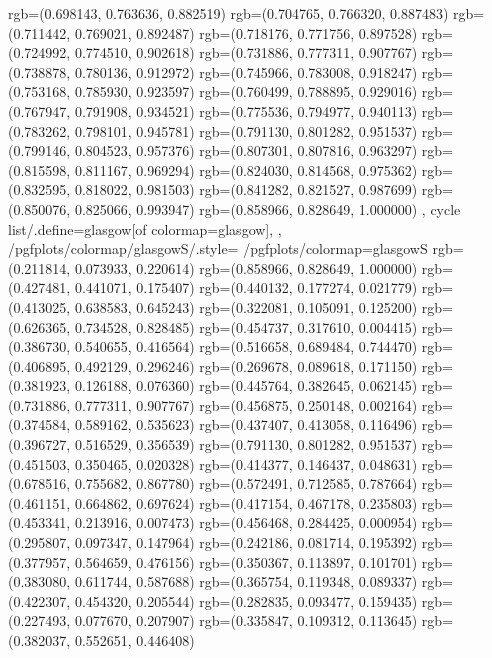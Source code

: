 {{{					rgb=(0.698143, 0.763636, 0.882519)
					rgb=(0.704765, 0.766320, 0.887483)
					rgb=(0.711442, 0.769021, 0.892487)
					rgb=(0.718176, 0.771756, 0.897528)
					rgb=(0.724992, 0.774510, 0.902618)
					rgb=(0.731886, 0.777311, 0.907767)
					rgb=(0.738878, 0.780136, 0.912972)
					rgb=(0.745966, 0.783008, 0.918247)
					rgb=(0.753168, 0.785930, 0.923597)
					rgb=(0.760499, 0.788895, 0.929016)
					rgb=(0.767947, 0.791908, 0.934521)
					rgb=(0.775536, 0.794977, 0.940113)
					rgb=(0.783262, 0.798101, 0.945781)
					rgb=(0.791130, 0.801282, 0.951537)
					rgb=(0.799146, 0.804523, 0.957376)
					rgb=(0.807301, 0.807816, 0.963297)
					rgb=(0.815598, 0.811167, 0.969294)
					rgb=(0.824030, 0.814568, 0.975362)
					rgb=(0.832595, 0.818022, 0.981503)
					rgb=(0.841282, 0.821527, 0.987699)
					rgb=(0.850076, 0.825066, 0.993947)
					rgb=(0.858966, 0.828649, 1.000000)
			},
		cycle list/.define={glasgow}{[of colormap=glasgow]},
		},
		/pgfplots/colormap/glasgowS/.style={
			/pgfplots/colormap={glasgowS}{%
					rgb=(0.211814, 0.073933, 0.220614)
					rgb=(0.858966, 0.828649, 1.000000)
					rgb=(0.427481, 0.441071, 0.175407)
					rgb=(0.440132, 0.177274, 0.021779)
					rgb=(0.413025, 0.638583, 0.645243)
					rgb=(0.322081, 0.105091, 0.125200)
					rgb=(0.626365, 0.734528, 0.828485)
					rgb=(0.454737, 0.317610, 0.004415)
					rgb=(0.386730, 0.540655, 0.416564)
					rgb=(0.516658, 0.689484, 0.744470)
					rgb=(0.406895, 0.492129, 0.296246)
					rgb=(0.269678, 0.089618, 0.171150)
					rgb=(0.381923, 0.126188, 0.076360)
					rgb=(0.445764, 0.382645, 0.062145)
					rgb=(0.731886, 0.777311, 0.907767)
					rgb=(0.456875, 0.250148, 0.002164)
					rgb=(0.374584, 0.589162, 0.535623)
					rgb=(0.437407, 0.413058, 0.116496)
					rgb=(0.396727, 0.516529, 0.356539)
					rgb=(0.791130, 0.801282, 0.951537)
					rgb=(0.451503, 0.350465, 0.020328)
					rgb=(0.414377, 0.146437, 0.048631)
					rgb=(0.678516, 0.755682, 0.867780)
					rgb=(0.572491, 0.712585, 0.787664)
					rgb=(0.461151, 0.664862, 0.697624)
					rgb=(0.417154, 0.467178, 0.235803)
					rgb=(0.453341, 0.213916, 0.007473)
					rgb=(0.456468, 0.284425, 0.000954)
					rgb=(0.295807, 0.097347, 0.147964)
					rgb=(0.242186, 0.081714, 0.195392)
					rgb=(0.377957, 0.564659, 0.476156)
					rgb=(0.350367, 0.113897, 0.101701)
					rgb=(0.383080, 0.611744, 0.587688)
					rgb=(0.365754, 0.119348, 0.089337)
					rgb=(0.422307, 0.454320, 0.205544)
					rgb=(0.282835, 0.093477, 0.159435)
					rgb=(0.227493, 0.077670, 0.207907)
					rgb=(0.335847, 0.109312, 0.113645)
					rgb=(0.382037, 0.552651, 0.446408)
}}}
